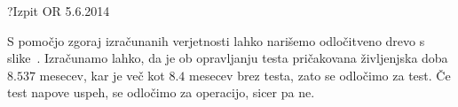 \begin{naloga}{?}{Izpit OR 5.6.2014}
\begin{odgovor}
\begin{enumerate}[(a)]
S pomočjo zgoraj izračunanih verjetnosti
lahko narišemo odločitveno drevo s slike~\fig{}.
Izračunamo lahko, da je ob opravljanju testa
pričakovana življenjska doba $8.537$ mesecev,
kar je več kot $8.4$ mesecev brez testa,
zato se odločimo za test.
Če test napove uspeh, se odločimo za operacijo, sicer pa ne.
\end{enumerate}

\begin{slika}
\makebox[\textwidth][c]{
\pgfslika
}
\end{slika}
\end{odgovor}
\end{naloga}
